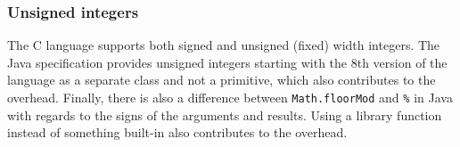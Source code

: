 \subsubsection{Unsigned integers}
The C language supports both signed and unsigned (fixed) width integers. The Java specification provides unsigned integers starting with the 8th version of the language as a separate class and not a primitive, which also contributes to the overhead. Finally, there is also a difference between \texttt{Math.floorMod} and \texttt{\%} in Java with regards to the signs of the arguments and results. Using a library function instead of something built-in also contributes to the overhead.

